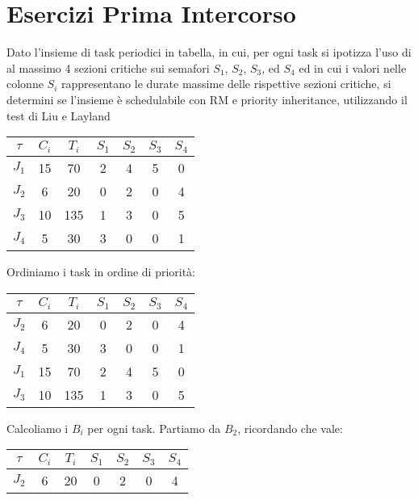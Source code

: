 \chapter{Esercizi Prima Intercorso}



\begin{Esercizio1}
Dato l'insieme di task periodici in tabella, in cui, per 
ogni task si ipotizza l'uso di al massimo 4 sezioni critiche 
sui semafori $S_1$, $S_2$, $S_3$, ed $S_4$ ed in cui i valori 
nelle colonne $S_i$ rappresentano le durate massime 
delle rispettive sezioni critiche, si determini 
se l'insieme è schedulabile con RM e priority 
inheritance, utilizzando il test di Liu e Layland

\begin{table}[h]
\centering
\begin{tabular}{|c|c|c|c|c|c|c|}
\hline
\(\tau\) & $C_i$ & $T_i$ & $S_1$ & $S_2$ & $S_3$ & $S_4$ \\
\hline
$J_1$ & 15 & 70 & 2 & 4 & 5 & 0 \\
\hline
$J_2$ & 6 & 20 & 0 & 2 & 0 & 4 \\
\hline
$J_3$ & 10 & 135 & 1 & 3 & 0 & 5 \\
\hline
$J_4$ & 5 & 30 & 3 & 0 & 0 & 1 \\
\hline
\end{tabular}
\label{tab:task_periodici}
\end{table}




Ordiniamo i task in ordine di priorità:
\begin{table}[h]
\centering
\begin{tabular}{|c|c|c|c|c|c|c|}
\hline
\(\tau\) & $C_i$ & $T_i$ & $S_1$ & $S_2$ & $S_3$ & $S_4$ \\
\hline
$J_2$ & 6 & 20 & 0 & 2 & 0 & 4 \\
\hline
$J_4$ & 5 & 30 & 3 & 0 & 0 & 1 \\
\hline
$J_1$ & 15 & 70 & 2 & 4 & 5 & 0 \\
\hline
$J_3$ & 10 & 135 & 1 & 3 & 0 & 5 \\
\hline
\end{tabular}
\label{tab:task_periodici}
\end{table}





Calcoliamo i \(B_i\) per ogni task. Partiamo da \(B_2\),
ricordando che vale:
\begin{table}[h]
\centering
\begin{tabular}{|c|c|c|c|c|c|c|}
\hline
\(\tau\) & $C_i$ & $T_i$ & $S_1$ & $S_2$ & $S_3$ & $S_4$ \\
\hline
$J_2$ & 6 & 20 & 0 & 2 & 0 & 4 \\


\end{tabular}
\end{table}
\end{Esercizio1}

